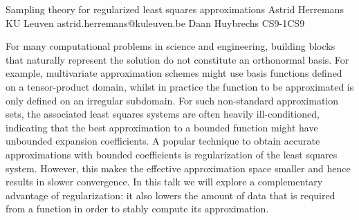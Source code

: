 \begin{talk}
  {Sampling theory for regularized least squares approximations}%
  {Astrid Herremans}%
  {KU Leuven}%
  {astrid.herremans@kuleuven.be}%
  {Daan Huybrechs}%
{}{}{CS9-1}{CS9}

			
For many computational problems in science and engineering, building blocks that naturally represent the solution do not constitute an orthonormal basis. For example, multivariate approximation schemes might use basis functions defined on a tensor-product domain, whilst in practice the function to be approximated is only defined on an irregular subdomain. For such non-standard approximation sets, the associated least squares systems are often heavily ill-conditioned, indicating that the best approximation to a bounded function might have unbounded expansion coefficients. A popular technique to obtain accurate approximations with bounded coefficients is regularization of the least squares system. However, this makes the effective approximation space smaller and hence results in slower convergence. In this talk we will explore a complementary advantage of regularization: it also lowers the amount of data that is required from a function in order to stably compute its approximation.

\end{talk}

